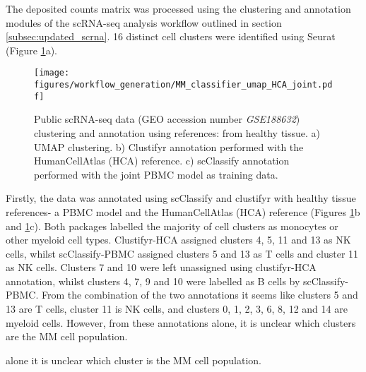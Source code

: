 The deposited counts matrix was processed using the clustering and annotation modules of the scRNA-seq analysis workflow outlined in section \ref{subsec:updated_scrna}.
16 distinct cell clusters were identified using Seurat (Figure \ref{fig:mm_class_umap_annotate}a).
\begin{figure}[htb]
\centering
\texttt{[image: figures/workflow\_generation/MM\_classifier\_umap\_HCA\_joint.pdf]}
\caption[Public scRNA-seq data clustering and annotation]{Public scRNA-seq data (GEO accession number \textit{GSE188632}) clustering and annotation using references: from healthy tissue.
a) UMAP clustering.
b) Clustifyr annotation performed with the HumanCellAtlas (HCA) reference.
c) scClassify annotation performed with the joint PBMC model as training data.
}
\label{fig:mm_class_umap_annotate}
\end{figure}
%
Firstly, the data was annotated using scClassify and clustifyr with healthy tissue references- a PBMC model and the HumanCellAtlas (HCA) reference (Figures \ref{fig:mm_class_umap_annotate}b and \ref{fig:mm_class_umap_annotate}c).
Both packages labelled the majority of cell clusters as monocytes or other myeloid cell types.
Clustifyr-HCA assigned clusters 4, 5, 11 and 13 as NK cells, whilst scClassify-PBMC assigned clusters 5 and 13 as T cells and cluster 11 as NK cells.
Clusters 7 and 10 were left unassigned using clustifyr-HCA annotation, whilst clusters 4, 7, 9 and 10 were labelled as B cells by scClassify-PBMC.
From the combination of the two annotations it seems like clusters 5 and 13 are T cells, cluster 11 is NK cells, and clusters 0, 1, 2, 3, 6, 8, 12 and 14 are myeloid cells.
However, from these annotations alone, it is unclear which clusters are the MM cell population.

alone it is unclear which cluster is the MM cell population.

